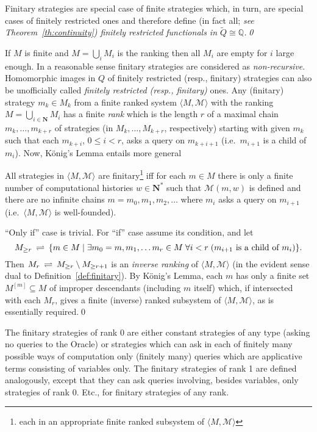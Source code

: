 \documentclass[fleqn]{LMCS}
\theoremstyle{plain}\newtheorem{satz}[thm]{Satz}
\theoremstyle{plain}\newtheorem{hyp}[thm]{Hypothesis}
\theoremstyle{plain}\newtheorem{hyps}[thm]{Hypotheses}
\theoremstyle{definition}\newtheorem{note}[thm]{Note}
\newcommand{\setof}[1]{\{#1\}}
\newcommand{\bYdef}{\mathrel{\BYDEF}}
\newcommand{\BYDEF}{\mbox{$\hspace{.2em}\rightleftharpoons\hspace{.2em}$}}
\newcommand{\la}{\langle}
\newcommand{\ra}{\rangle}
\newcommand{\tuple}[1]{\la #1 \ra}
\newcommand{\NN}{\mathbf{N}}
\newcommand{\bbQ}{\mathbb{Q}}
\newcommand{\MM}{{\mathcal M}}
\newcommand{\tQ}{\tilde{Q}}
\newcommand{\?}{\mbox{?}}
\begin{document}
\begin{lem}\label{lemma:finitary-finitely-restricted}
Finitary strategies are special case of finite strategies 
which, in turn, are special cases of finitely restricted ones and therefore 
define (in fact all; \em see Theorem~\ref{th:continuity}\em) finitely restricted 
functionals in $\tQ\cong\bbQ$.\qed
\end{lem}
\noindent
If $M$ is finite and $M=\bigcup_i M_i$ is the ranking then all $M_i$ 
are empty for $i$ large enough.
In a reasonable sense 
finitary strategies are considered as \emph{non-recursive}. 
Homomorphic images in $Q$ of finitely restricted (resp., finitary) strategies 
can also be unofficially called \emph{finitely restricted (resp., finitary)} ones. 
Any (finitary) strategy $m_k\in M_k$ from a finite ranked system 
$\tuple{M,\MM}$ with the ranking $M=\bigcup_{i\in \NN} M_i$ 
has a finite \emph{rank} 
which is the length $r$ 
of a maximal chain $m_k,\ldots,m_{k+r}$ of strategies 
(in $M_k,\ldots,M_{k+r}$, respectively) starting with given $m_k$ 
such that each 
$m_{k+i}$, $0\le i<r$, asks a query on $m_{k+i+1}$ 
(i.e.\ $m_{i+1}$ is a child of~$m_i$). 
Now, K\"onig's Lemma entails more general
\begin{prop}\label{prop:finitary}
All strategies in $\tuple{M,\MM}$ are finitary\footnote{each in an appropriate finite ranked subsystem of $\tuple{M,\MM}$
} 
iff for each $m\in M$ 
there is only a finite number of computational histories $w\in\NN^*$ such that 
$\MM(m,w)$ is defined and there are no infinite chains 
$m=m_0,m_1,m_2,\ldots$ where $m_i$ asks a query on $m_{i+1}$ 
(i.e.\ $\tuple{M,\MM}$ is well-founded). 
\end{prop}
\proof
``Only if'' case is trivial. For ``if'' case assume its condition, and let 
\[
M_{{}\ge r}\bYdef\setof{m\in M\mid \exists m_0=m,m_1,\ldots m_r\in M
\;\forall i<r\;(m_{i+1}\textrm{ is a child of }m_i)}. 
\]
Then  
$M_r\bYdef M_{{}\ge r}\setminus M_{{}\ge r+1}$ is an \emph{inverse ranking} 
of $\tuple{M,\MM}$ (in the evident sense dual to Definition~\ref{def:finitary}). 
By K\"onig's Lemma, each $m$ has only a finite set $M^{[m]}\subseteq M$ 
of improper descendants (including $m$ itself) 
which, if intersected with each $M_r$, gives a finite (inverse) ranked 
subsystem of $\tuple{M,\MM}$, as is essentially required.\qed

\noindent
The finitary strategies of rank 0 are either constant strategies of any type 
(asking no queries to the Oracle) or strategies which can ask 
in each of finitely many possible ways of computation 
only (finitely many) queries which are applicative terms 
consisting of variables only. 
The finitary strategies of rank 1 are defined analogously, except that they can ask 
queries involving, besides variables, only strategies of rank 0. 
Etc., for finitary strategies of any rank. 
\end{document}
